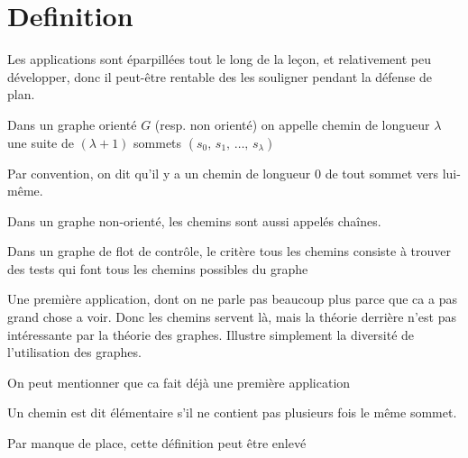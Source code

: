 
\section{Definition}

\begin{com}
	Les applications sont éparpillées tout le long de la leçon, et relativement peu développer, donc il peut-être rentable des les souligner pendant la défense de plan.
\end{com}

\begin{definition}[chemin]
	Dans un graphe orienté $G$ (resp. non orienté) on appelle chemin de longueur $\lambda$ une suite de $(\lambda + 1)$ sommets $(s_0, \, s_1, \,\dots, \, s_\lambda)$
\end{definition}

\begin{rem}
	Par convention, on dit qu’il y a un chemin de longueur 0 de tout sommet vers lui-même.
\end{rem}

\begin{rem}
	Dans un graphe non-orienté, les chemins sont aussi appelés chaînes.
\end{rem}

\begin{appl}
	Dans un graphe de flot de contrôle, le critère tous les chemins consiste à trouver des tests qui font tous les chemins possibles du graphe
\end{appl}

\begin{com}
	Une première application, dont on ne parle pas beaucoup plus parce que ca a pas grand chose a voir. Donc les chemins servent là, mais la théorie derrière n'est pas intéressante par la théorie des graphes. Illustre simplement la diversité de l'utilisation des graphes.
\end{com}

\begin{com}
	On peut mentionner que ca fait déjà une première application
\end{com}

\begin{definition}
	Un chemin est dit élémentaire s’il ne contient pas plusieurs fois le même sommet.
\end{definition}

\begin{com}
	Par manque de place, cette définition peut être enlevé
\end{com}

